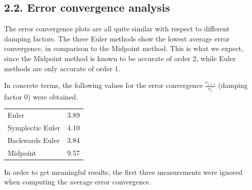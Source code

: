 \subsection*{2.2. Error convergence analysis}
The error convergence plots are all quite similar with respect to different damping factors. The three Euler methods show the lowest average error convergence, in comparison to the Midpoint method. This is what we expect, since the Midpoint method is known to be accurate of order 2, while Euler methods are only accurate of order 1.

In concrete terms, the following values for the error convergence $\frac{e_{i+1}}{e_i}$ (damping factor 0) were obtained.

\begin{tabular}{ll}
Euler			& 3.89\\
Symplectic Euler	& 4.10\\
Backwards Euler		& 3.84\\
Midpoint		& 9.57\\
\end{tabular}

In order to get meaningful results, the first three measurements were ignored when computing the average error convergence.


